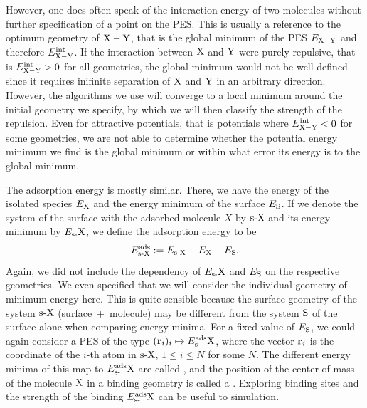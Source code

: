 \documentclass[8.5pt,twoside,twocolumn]{article}
\newcommand\eint{\enmat{E^{\te{int}}}}
\newcommand\eads{\enmat{E^{\te{ads}}}}
\renewcommand\r{\bo r}
\theoremstyle{standard}
\begin{document}
However, one does often speak of the interaction energy of two molecules without further specification
of a point on the PES. This is usually a reference to the optimum geometry
of $\XY$, that is the global minimum of the PES $E_{\XY}$ and therefore $\eint_\XY$. If the interaction between $\X$ and $\Y$
were purely repulsive, that is $\eint_{\XY} > 0$ for all geometries, the global minimum would
not be well-defined since it requires inifinite separation of $\X$ and $\Y$ in an arbitrary direction.
However, the algorithms we use will converge to a local minimum around the initial geometry we
specify, by which we will then classify the strength of the repulsion. Even for attractive potentials,
that is potentials where $\eint_\XY < 0$ for some geometries, we are not able to determine whether 
the potential energy minimum we find is the global minimum or within what error its energy is
to the global minimum.

The adsorption energy is mostly similar. There, we have the energy of the isolated species
$E_\X$ and the energy minimum of the surface $E_{\S}$. If we denote the system of the surface 
with the adsorbed molecule $X$ by $\sX$ and its energy minimum by $E_\sX$, we define
the adsorption energy to be
\begin{equation}
 \eads_{\sX}:= E_{\sX} - E_\X - E_\S.
 \label{Theo:AdsorptionEnergy}
\end{equation}
Again, we did not include the dependency of $E_\sX$ and $E_\S$ on the respective geometries. We
even specified that we will consider the individual geometry of minimum energy here. This is quite sensible
because the surface geometry of the system $\sX$ \mbox{(surface + molecule)} may be different from the
system $\S$ of the surface alone when comparing energy minima. For a fixed value of $E_\S$, 
we could again consider a PES of the type \mbox{$(\bo r_i)_i \mapsto \eads_\sX$}, where the
vector $\r_i$ is the coordinate of the $i$-th atom in $\sX$, $1 \le i \le N$ for some $N$. The different energy minima of 
this map to $\eads_\sX$ are called , and the position of the
center of mass of the molecule $\X$ in a binding geometry is called a .
Exploring binding sites and the strength of the binding $\eads_\sX$ can be useful
to simulation.
\end{document}
